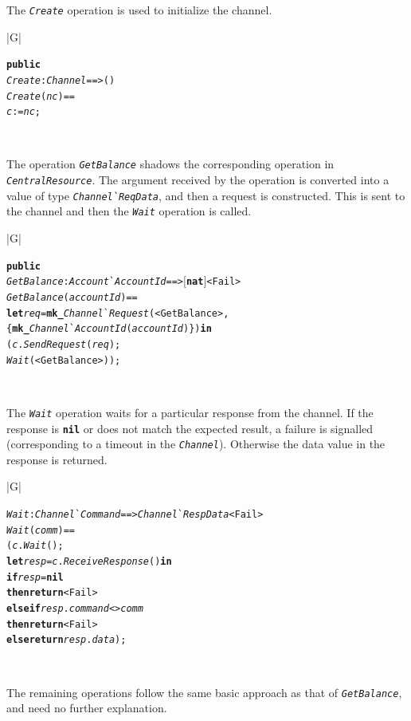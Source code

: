 \documentclass[\pformat,12pt,twoside]{article}
\newenvironment{VDMgray}%
{\begin{tabular}{|G|}\hline\small\begin{alltt}}%
{\end{alltt}\normalsize\\
 \hline\end{tabular}}
\begin{document}
The \texttt{\emph{Create}} operation is used to initialize the channel.

\begin{VDMgray}
 \textbf{public}
 \textit{Create} : \textit{Channel} ==\texttt{>} ()
 \textit{Create}(\textit{nc}) ==
   \textit{c} := \textit{nc};
\end{VDMgray}


The operation \texttt{\emph{GetBalance}} shadows the corresponding
operation in \texttt{\emph{CentralResource}}. The argument received by
the operation is converted into a value of type
\texttt{\emph{Channel\`{}ReqData}}, and then a request is
constructed. This is sent to the channel and then the
\texttt{\emph{Wait}} operation is called.

\begin{VDMgray}
 \textbf{public}
 \textit{GetBalance} : \textit{Account}\`{}\textit{AccountId} ==\texttt{>} \ensuremath{[}\textbf{nat}\ensuremath{]}{\textbar} \texttt{<}Fail\texttt{>}
 \textit{GetBalance}(\textit{accountId}) ==
   \textbf{let} \textit{req} = \textbf{mk\_}\textit{Channel}\`{}\textit{Request}(\texttt{<}GetBalance\texttt{>},
             \{\textbf{mk\_}\textit{Channel}\`{}\textit{AccountId}(\textit{accountId})\}) \textbf{in}
     (\textit{c}.\textit{SendRequest}(\textit{req});
      \textit{Wait}(\texttt{<}GetBalance\texttt{>}));
\end{VDMgray}


The \texttt{\emph{Wait}} operation waits for a particular response
from the channel.  If the response is \texttt{\textbf{nil}} or does
not match the expected result, a failure is signalled (corresponding
to a timeout in the \texttt{\emph{Channel}}).  Otherwise the data
value in the response is returned.

\begin{VDMgray}
 \textit{Wait} : \textit{Channel}\`{}\textit{Command} ==\texttt{>} \textit{Channel}\`{}\textit{RespData} {\textbar} \texttt{<}Fail\texttt{>}
 \textit{Wait}(\textit{comm}) ==
   (\textit{c}.\textit{Wait}();
    \textbf{let} \textit{resp} = \textit{c}.\textit{ReceiveResponse}() \textbf{in}
      \textbf{if} \textit{resp} = \textbf{nil}
      \textbf{then} \textbf{return} \texttt{<}Fail\texttt{>}
      \textbf{elseif} \textit{resp}.\textit{command} \texttt{<}\texttt{>} \textit{comm}
      \textbf{then} \textbf{return} \texttt{<}Fail\texttt{>}
      \textbf{else} \textbf{return} \textit{resp}.\textit{data});
\end{VDMgray}


The remaining operations follow the same basic approach as that 
of \texttt{\emph{GetBalance}}, and need no further explanation.
\end{document}
